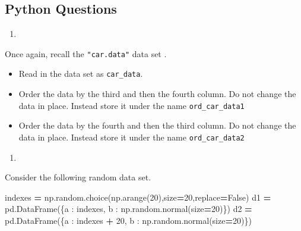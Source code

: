 \documentclass[
  12pt,
  krantz2]{krantz}
\makeatletter
\newenvironment{Shaded}{\begin{snugshade}}{\end{snugshade}}
\newcommand{\DecValTok}[1]{\textcolor[rgb]{0.06,0.06,0.06}{#1}}
\newcommand{\NormalTok}[1]{#1}
\newcommand{\OperatorTok}[1]{\textcolor[rgb]{0.43,0.43,0.43}{\textbf{#1}}}
\newcommand{\StringTok}[1]{\textcolor[rgb]{0.5,0.5,0.5}{#1}}
\newcommand{\VariableTok}[1]{\textcolor[rgb]{0,0,0}{#1}}
\providecommand{\tightlist}{%
  \setlength{\itemsep}{0pt}\setlength{\parskip}{0pt}}
\newenvironment{kframe}{%
\medskip{}
\setlength{\fboxsep}{.8em}
 \def\at@end@of@kframe{}%
 \ifinner\ifhmode%
  \def\at@end@of@kframe{\end{minipage}}%
  \begin{minipage}{\columnwidth}%
 \fi\fi%
 \def\FrameCommand##1{\hskip\@totalleftmargin \hskip-\fboxsep
 \colorbox{shadecolor}{##1}\hskip-\fboxsep
     \hskip-\linewidth \hskip-\@totalleftmargin \hskip\columnwidth}%
 \MakeFramed {\advance\hsize-\width
   \@totalleftmargin\z@ \linewidth\hsize
   \@setminipage}}%
 {\par\unskip\endMakeFramed%
 \at@end@of@kframe}
\renewenvironment{Shaded}{\begin{kframe}}{\end{kframe}}
\makeatother
\begin{document}
\hypertarget{python-questions-9}{%
\subsection{Python Questions}\label{python-questions-9}}

\begin{enumerate}
\def\labelenumi{\arabic{enumi}.}
\tightlist
\item
\end{enumerate}

Once again, recall the \texttt{"car.data"} data set \citep{misc_car_evaluation_19}.

\begin{itemize}
\tightlist
\item
  Read in the data set as \texttt{car\_data}.
\item
  Order the data by the third and then the fourth column. Do not change the data in place. Instead store it under the name \texttt{ord\_car\_data1}
\item
  Order the data by the fourth and then the third column. Do not change the data in place. Instead store it under the name \texttt{ord\_car\_data2}
\end{itemize}

\begin{enumerate}
\def\labelenumi{\arabic{enumi}.}
\setcounter{enumi}{1}
\tightlist
\item
\end{enumerate}

Consider the following random data set.

\begin{Shaded}
\begin{Highlighting}[]
\NormalTok{indexes  }\OperatorTok{=}\NormalTok{ np.random.choice(np.arange(}\DecValTok{20}\NormalTok{),size}\OperatorTok{=}\DecValTok{20}\NormalTok{,replace}\OperatorTok{=}\VariableTok{False}\NormalTok{)}
\NormalTok{d1 }\OperatorTok{=}\NormalTok{ pd.DataFrame(\{}\StringTok{\textquotesingle{}a\textquotesingle{}}\NormalTok{ : indexes, }
                        \StringTok{\textquotesingle{}b\textquotesingle{}}\NormalTok{ : np.random.normal(size}\OperatorTok{=}\DecValTok{20}\NormalTok{)\})}
\NormalTok{d2 }\OperatorTok{=}\NormalTok{ pd.DataFrame(\{}\StringTok{\textquotesingle{}a\textquotesingle{}}\NormalTok{ : indexes }\OperatorTok{+} \DecValTok{20}\NormalTok{, }
                        \StringTok{\textquotesingle{}b\textquotesingle{}}\NormalTok{ : np.random.normal(size}\OperatorTok{=}\DecValTok{20}\NormalTok{)\})}
\end{Highlighting}
\end{Shaded}
\end{document}
